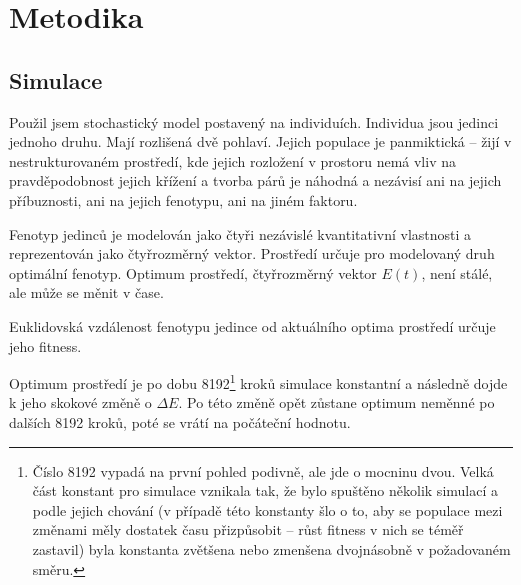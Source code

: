 \chapter{Metodika}



\section{Simulace}

Použil jsem stochastický model postavený na individuích. Individua jsou jedinci jednoho druhu. Mají rozlišená
dvě pohlaví. Jejich populace je panmiktická -- žijí v nestrukturovaném prostředí, kde jejich rozložení v prostoru nemá
vliv na pravděpodobnost jejich křížení a tvorba párů je náhodná a nezávisí ani na jejich příbuznosti, ani na jejich
fenotypu, ani na jiném faktoru.

Fenotyp jedinců je modelován jako čtyři nezávislé kvantitativní vlastnosti a reprezentován jako čtyřrozměrný vektor.
Prostředí určuje pro modelovaný druh optimální fenotyp. Optimum prostředí, čtyřrozměrný vektor $E(t)$, není stálé,
ale může se měnit v čase.

Euklidovská vzdálenost fenotypu jedince od aktuálního optima prostředí určuje jeho fitness.

Optimum prostředí je po dobu 8192\footnote{
Číslo 8192 vypadá na první pohled podivně, ale jde o mocninu dvou. Velká část konstant pro simulace vznikala tak, že
bylo spuštěno několik simulací a podle jejich chování (v případě této konstanty šlo o to, aby se populace mezi změnami
měly dostatek času přizpůsobit -- růst fitness v nich se téměř zastavil) byla konstanta zvětšena nebo zmenšena
dvojnásobně v požadovaném směru.
}
kroků simulace konstantní a následně dojde k jeho skokové změně o $\Delta{}E$. Po této změně opět
zůstane optimum neměnné po dalších 8192 kroků, poté se vrátí na počáteční hodnotu.

